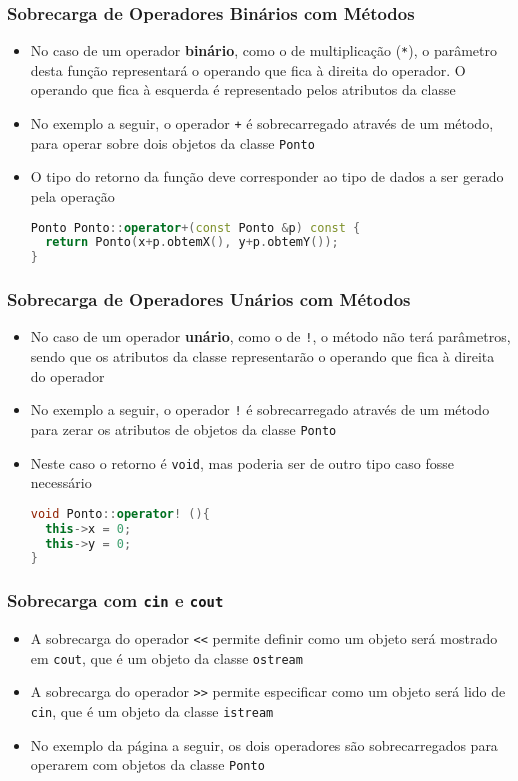 \documentclass[aspectratio=169]{beamer}
\begin{document}
\begin{frame}[fragile]\frametitle{Sobrecarga de Operadores Binários com Métodos}
\begin{itemize}
	\item No caso de um operador \textbf{binário}, como o de multiplicação (\texttt{*}), o parâmetro desta função representará o operando que fica à direita do operador. O operando que fica à esquerda é representado pelos atributos da classe
	\item No exemplo a seguir, o operador \texttt{+} é sobrecarregado através de um método, para operar sobre dois objetos da classe \texttt{Ponto}
	\item O tipo do retorno da função deve corresponder ao tipo de dados a ser gerado pela operação
\begin{lstlisting}[language=C++,basicstyle=\ttfamily\small]
Ponto Ponto::operator+(const Ponto &p) const {
  return Ponto(x+p.obtemX(), y+p.obtemY());
}
\end{lstlisting}
\end{itemize}
\end{frame}

\begin{frame}[fragile]\frametitle{Sobrecarga de Operadores Unários com Métodos}
\begin{itemize}
	\item No caso de um operador \textbf{unário}, como o de \texttt{!}, o método não terá parâmetros, sendo que os atributos da classe representarão o operando que fica à direita do operador
	\item No exemplo a seguir, o operador \texttt{!} é sobrecarregado através de um método para zerar os atributos de objetos da classe \texttt{Ponto}
	\item Neste caso o retorno é \texttt{void}, mas poderia ser de outro tipo caso fosse necessário
\begin{lstlisting}[language=C++,basicstyle=\ttfamily\small]
void Ponto::operator! (){
  this->x = 0;
  this->y = 0;
}
\end{lstlisting}
\end{itemize}
\end{frame}

\begin{frame}\frametitle{Sobrecarga com \texttt{cin} e \texttt{cout}}
\begin{itemize}
	\item A sobrecarga do operador \texttt{\textless{}\textless} permite definir como um objeto será mostrado em \texttt{cout}, que é um objeto da classe \texttt{ostream}
	\item A sobrecarga do operador \texttt{\textgreater{}\textgreater} permite especificar como um objeto será lido de \texttt{cin}, que é um objeto da classe \texttt{istream}
	\item No exemplo da página a seguir, os dois operadores são sobrecarregados para operarem com objetos da classe \texttt{Ponto}
\end{itemize}
\end{frame}
\end{document}
